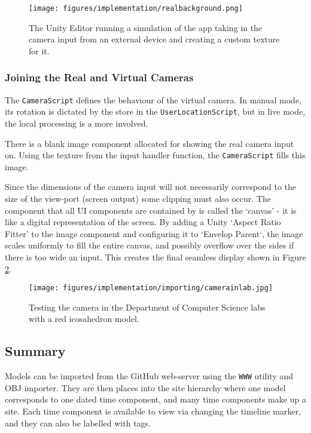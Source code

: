 \documentclass[12pt, a4paper]{article}
\begin{document}
\begin{figure}[h]
    \centering
    \texttt{[image: figures/implementation/realbackground.png]}
        \caption{The Unity Editor running a simulation of the app taking in the camera input from an external device and creating a custom texture for it.}
        \label{fig:camerabackground}
\end{figure}

\subsubsection{Joining the Real and Virtual Cameras}
The \verb|CameraScript| defines the behaviour of the virtual camera. In manual mode, its rotation is dictated by the store in the \verb|UserLocationScript|, but in live mode, the local processing is a more involved.

There is a blank image component allocated for showing the real camera input on. Using the texture from the input handler function, the \verb|CameraScript| fills this image. 

Since the dimensions of the camera input will not necessarily correspond to the size of the view-port (screen output) some clipping must also occur. The component that all UI components are contained by is called the `canvas' - it is like a digital representation of the screen. By adding a Unity `Aspect Ratio Fitter' to the image component and configuring it to `Envelop Parent`, the image scales uniformly to fill the entire canvas, and possibly overflow over the sides if there is too wide an input. This creates the final seamless display shown in Figure \ref{fig:camerainlab}.

\begin{figure}[]
    \centering
    \texttt{[image: figures/implementation/importing/camerainlab.jpg]}
        \caption{Testing the camera in the Department of Computer Science labs with a red icosahedron model.}
        \label{fig:camerainlab}
\end{figure}

\subsection{Summary}
Models can be imported from the GitHub web-server using the \verb|WWW| utility and OBJ importer. They are then places into the site hierarchy where one model corresponds to one dated time component, and many time components make up a site. Each time component is available to view via changing the timeline marker, and they can also be labelled with tags.
\end{document}
